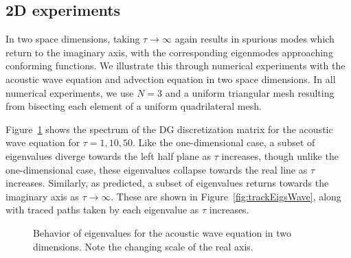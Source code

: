 \documentclass[preprint,10pt]{elsarticle}
\newcommand{\note}[1]{{\color{blue}#1}}
\begin{document}
\subsection{2D experiments}

In two space dimensions, taking $\tau\rightarrow \infty$ again results in spurious modes which return to the imaginary axis, with the corresponding eigenmodes approaching conforming functions.  We illustrate this through numerical experiments with the acoustic wave equation and advection equation in two space dimensions.  In all numerical experiments, we use $N=3$ and a uniform triangular mesh resulting from bisecting each element of a uniform quadrilateral mesh.  

Figure~\ref{fig:waveeigs} shows the \note{spectrum} of the DG discretization matrix for the acoustic wave equation for $\tau = 1, 10, 50$.  Like the one-dimensional case, a subset of eigenvalues diverge towards the left half plane as $\tau$ increases, though unlike the one-dimensional case, these eigenvalues collapse towards the real line as $\tau$ increases.  Similarly, as predicted, a subset of eigenvalues returns towards the imaginary axis as $\tau \rightarrow \infty$.  These are shown in Figure~\ref{fig:trackEigsWave}, along with traced paths taken by each eigenvalue as $\tau$ increases.  

\begin{figure}
\centering
{}
\hspace{.5em}
\hspace{.5em}
\caption{Behavior of eigenvalues for the acoustic wave equation in two dimensions. Note the changing scale of the real axis.}
\label{fig:waveeigs}
\end{figure}
\end{document}
